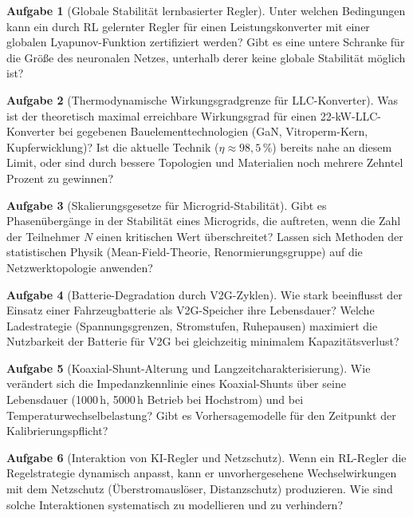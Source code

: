﻿\documentclass[a4paper,12pt,openany,oneside]{book}
\theoremstyle{definition}
\newtheorem{aufgabe}{Aufgabe}[chapter]
\begin{document}
\begin{aufgabe}[Globale Stabilit\"at lernbasierter Regler]
  Unter welchen Bedingungen kann ein durch RL gelernter Regler f\"ur einen Leistungskonverter
  mit einer globalen Lyapunov-Funktion zertifiziert werden? Gibt es eine untere Schranke
  f\"ur die Gr\"o\ss{}e des neuronalen Netzes, unterhalb derer keine globale Stabilit\"at
  m\"oglich ist?
\end{aufgabe}

\begin{aufgabe}[Thermodynamische Wirkungsgradgrenze f\"ur LLC-Konverter]
  Was ist der theoretisch maximal erreichbare Wirkungsgrad f\"ur einen 22-kW-LLC-Konverter
  bei gegebenen Bauelementtechnologien (GaN, Vitroperm-Kern, Kupferwicklung)?
  Ist die aktuelle Technik ($\eta \approx 98{,}5\,\%$) bereits nahe an diesem Limit,
  oder sind durch bessere Topologien und Materialien noch mehrere Zehntel Prozent zu gewinnen?
\end{aufgabe}

\begin{aufgabe}[Skalierungsgesetze f\"ur Microgrid-Stabilit\"at]
  Gibt es Phasen\"uberg\"ange in der Stabilit\"at eines Microgrids, die auftreten, wenn die
  Zahl der Teilnehmer $N$ einen kritischen Wert \"uberschreitet? Lassen sich Methoden der
  statistischen Physik (Mean-Field-Theorie, Renormierungsgruppe) auf die Netzwerktopologie
  anwenden?
\end{aufgabe}

\begin{aufgabe}[Batterie-Degradation durch V2G-Zyklen]
  Wie stark beeinflusst der Einsatz einer Fahrzeugbatterie als V2G-Speicher ihre Lebensdauer?
  Welche Ladestrategie (Spannungsgrenzen, Stromstufen, Ruhepausen) maximiert die Nutzbarkeit
  der Batterie f\"ur V2G bei gleichzeitig minimalem Kapazit\"atsverlust?
\end{aufgabe}

\begin{aufgabe}[Koaxial-Shunt-Alterung und Langzeitcharakterisierung]
  Wie ver\"andert sich die Impedanzkennlinie eines Koaxial-Shunts \"uber seine Lebensdauer
  (1000\,h, 5000\,h Betrieb bei Hochstrom) und bei Temperaturwechselbelastung? Gibt es
  Vorhersagemodelle f\"ur den Zeitpunkt der Kalibrierungspflicht?
\end{aufgabe}

\begin{aufgabe}[Interaktion von KI-Regler und Netzschutz]
  Wenn ein RL-Regler die Regelstrategie dynamisch anpasst, kann er unvorhergesehene
  Wechselwirkungen mit dem Netzschutz (\"Uberstromausl\"oser, Distanzschutz) produzieren.
  Wie sind solche Interaktionen systematisch zu modellieren und zu verhindern?
\end{aufgabe}
\end{document}
